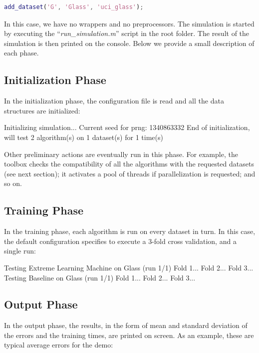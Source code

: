 \newpage

\begin{lstlisting}[language=matlab]
add_dataset('G', 'Glass', 'uci_glass');
\end{lstlisting}

\noindent In this case, we have no wrappers and no preprocessors. The simulation is started by executing the ``\textit{run\_simulation.m}'' script in the root folder. The result of the simulation is then printed on the console. Below we provide a small description of each phase.

\subsection{Initialization Phase}

In the initialization phase, the configuration file is read and all the data structures are initialized:

\begin{console}
Initializing simulation...
Current seed for prng: 1340863332
End of initialization, will test 2 algorithm(s) on 1
   dataset(s) for 1 time(s)
\end{console}

\noindent Other preliminary actions are eventually run in this phase. For example, the toolbox checks the compatibility of all the algorithms with the requested datasets (see next section); it activates a pool of threads if parallelization is requested; and so on.

\subsection{Training Phase}

In the training phase, each algorithm is run on every dataset in turn. In this case, the default configuration specifies to execute a $3$-fold cross validation, and a single run:

\begin{console}
Testing Extreme Learning Machine on Glass (run 1/1)
   Fold 1... 
   Fold 2... 
   Fold 3... 
Testing Baseline on Glass (run 1/1)
   Fold 1... 
   Fold 2... 
   Fold 3... 
\end{console}

\subsection{Output Phase}
\label{sec:outputphase}

In the output phase, the results, in the form of mean and standard deviation of the errors and the training times, are printed on screen. As an example, these are typical average errors for the demo:

